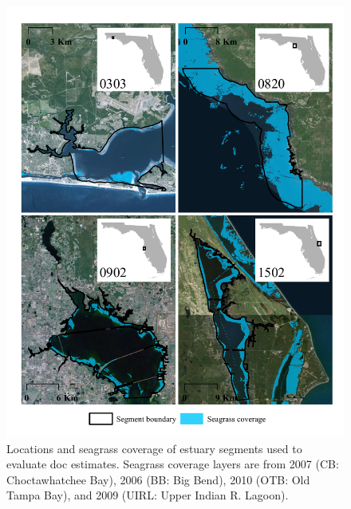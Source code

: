 \documentclass[letterpaper,12pt,oneside]{article}\usepackage[]{graphicx}\usepackage[]{color}
\begin{document}
\begin{figure}
\centerline{\includegraphics[width = \textwidth]{figs/seg_all.pdf}}
\caption{Locations and seagrass coverage of estuary segments used to evaluate \acl{doc} estimates.  Seagrass coverage layers are from 2007 (CB: Choctawhatchee Bay), 2006 (BB: Big Bend), 2010 (OTB: Old Tampa Bay), and 2009 (UIRL: Upper Indian R. Lagoon).}
\label{fig:seg_all}
\end{figure}

\end{document}
